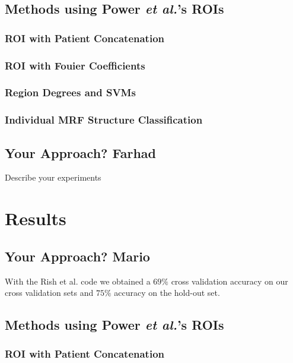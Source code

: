 \documentclass{article} %
\begin{document}
\subsection{Methods using Power \emph{et al.}'s ROIs}

\subsubsection{ROI with Patient Concatenation}

\subsubsection{ROI with Fouier Coefficients}

\subsubsection{Region Degrees and SVMs}

\subsubsection{Individual MRF Structure Classification}

\subsection{Your Approach? Farhad}
Describe your experiments

\section{Results}

\subsection{Your Approach? Mario}
With the Rish et al. code we obtained a $ 69\%$ cross validation accuracy on our cross validation sets and $75 \%$ accuracy on the hold-out set.

\subsection{Methods using Power \emph{et al.}'s ROIs}

\subsubsection{ROI with Patient Concatenation}
\end{document}
